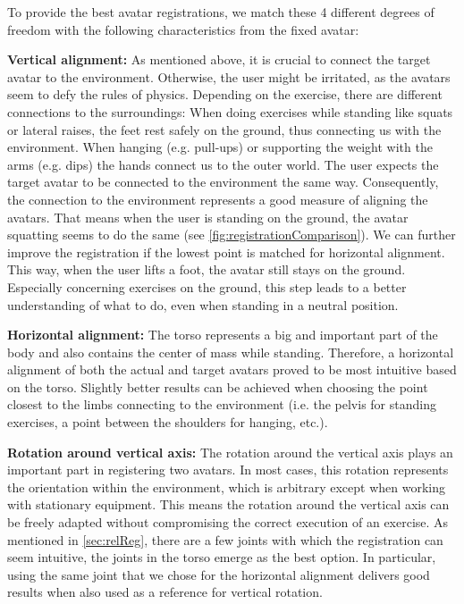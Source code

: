 To provide the best avatar registrations, we match these 4 different degrees of freedom with the following characteristics from the fixed avatar:

\textbf{Vertical alignment:} As mentioned above, it is crucial to connect the target avatar to the environment. Otherwise, the user might be irritated, as the avatars seem to defy the rules of physics. Depending on the exercise, there are different connections to the surroundings: When doing exercises while standing like squats or lateral raises, the feet rest safely on the ground, thus connecting us with the environment. When hanging (e.g. pull-ups) or supporting the weight with the arms (e.g. dips) the hands connect us to the outer world. The user expects the target avatar to be connected to the environment the same way. Consequently, the connection to the environment represents a good measure of aligning the avatars. That means when the user is standing on the ground, the avatar squatting seems to do the same (see \autoref{fig:registrationComparison}). We can further improve the registration if the lowest point is matched for horizontal alignment. This way, when the user lifts a foot, the avatar still stays on the ground. Especially concerning exercises on the ground, this step leads to a better understanding of what to do, even when standing in a neutral position.

\textbf{Horizontal alignment:} The torso represents a big and important part of the body and also contains the center of mass while standing. Therefore, a horizontal alignment of both the actual and target avatars proved to be most intuitive based on the torso. Slightly better results can be achieved when choosing the point closest to the limbs connecting to the environment (i.e. the pelvis for standing exercises, a point between the shoulders for hanging, etc.).

\textbf{Rotation around vertical axis:}
The rotation around the vertical axis plays an important part in registering two avatars. In most cases, this rotation represents the orientation within the environment, which is arbitrary except when working with stationary equipment. This means the rotation around the vertical axis can be freely adapted without compromising the correct execution of an exercise. As mentioned in \autoref{sec:relReg}, there are a few joints with which the registration can seem intuitive, the joints in the torso emerge as the best option. In particular, using the same joint that we chose for the horizontal alignment delivers good results when also used as a reference for vertical rotation.

